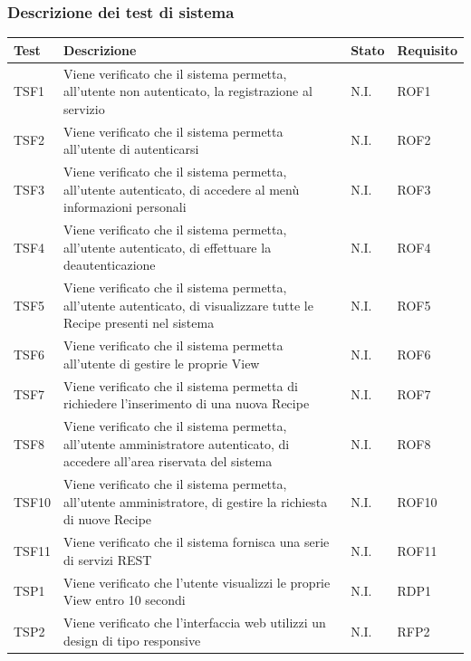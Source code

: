 		\subsubsection{Descrizione dei test di sistema}
			\begin{center}

			\def\arraystretch{1.5}
			\bgroup
			\begin{longtable}{| p{2cm} | p{7cm} | p{1.5cm} | p{2cm} |}
					\hline
					\textbf{Test} & \textbf{Descrizione} & \textbf{Stato} & \textbf{Requisito}\\
					\hline						
					TSF1 & Viene verificato che il sistema permetta, all'utente non autenticato, la registrazione al servizio & N.I. & ROF1\\
					\hline
					TSF2 & Viene verificato che il sistema permetta all'utente di autenticarsi & N.I. & ROF2\\
					\hline
					TSF3 & Viene verificato che il sistema permetta, all'utente autenticato, di accedere al menù informazioni personali & N.I. & ROF3\\
					\hline
					TSF4 & Viene verificato che il sistema permetta, all'utente autenticato, di effettuare la deautenticazione & N.I. & ROF4\\
					\hline
					TSF5 & Viene verificato che il sistema permetta, all'utente autenticato, di visualizzare tutte le Recipe presenti nel sistema & N.I. & ROF5\\
					\hline
					TSF6 & Viene verificato che il sistema permetta all'utente di gestire le proprie View & N.I. & ROF6\\
					\hline
					TSF7 & Viene verificato che il sistema permetta di richiedere l'inserimento di una nuova Recipe & N.I. & ROF7\\
					\hline
					TSF8 & Viene verificato che il sistema permetta, all'utente amministratore autenticato, di accedere all'area riservata del sistema & N.I. & ROF8\\
					\hline
					TSF10 & Viene verificato che il sistema permetta, all'utente amministratore, di gestire la richiesta di nuove Recipe & N.I. & ROF10\\
					\hline
					TSF11 & Viene verificato che il sistema fornisca una serie di servizi REST & N.I. & ROF11\\
					\hline
					TSP1 & Viene verificato che l'utente visualizzi le proprie View entro 10 secondi & N.I. & RDP1\\
					\hline
					TSP2 & Viene verificato che l'interfaccia web utilizzi un design di tipo responsive & N.I. & RFP2\\

\end{longtable}
\end{center}
